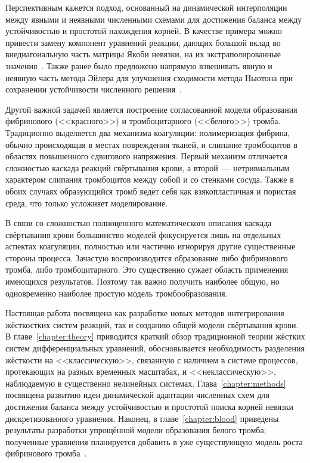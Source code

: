Перспективным кажется подход, основанный на динамической интерполяции между явными и неявными численными схемами
для достижения баланса между устойчивостью и простотой нахождения корней.
В качестве примера можно привести замену компонент уравнений реакции,
дающих большой вклад во внедиагональную часть матрицы Якоби невязки,
на их экстраполированные значения~\cite{vassilevski2020parallel}.
Также ранее было предложено напрямую взвешивать явную и неявную часть метода Эйлера для
улучшения сходимости метода Ньютона при сохранении устойчивости численного решения~\cite{butakov2022two_methods}.

Другой важной задачей является построение согласованной модели образования фибринового (<<красного>>)
и тромбоцитарного (<<белого>>) тромба.
Традиционно выделяется два механизма коагуляции:
полимеризация фибрина, обычно происходящая в местах повреждения тканей,
и слипание тромбоцитов в областях повышенного сдвигового напряжения.
Первый механизм отличается сложностью каскада реакций свёртывания крови,
а второй~--- нетривиальным характером слипания тромбоцитов между собой и со стенками сосуда.
Также в обоих случаях образующийся тромб ведёт себя как взякопластичная и пористая среда,
что только усложняет моделирование.

В связи со сложностью полноценного математического описания каскада свёртывания крови
большинство моделей фокусируется лишь на отдельных аспектах коагуляции,
полностью или частично игнорируя другие существенные стороны процесса.
Зачастую воспроизводится образование либо фибринового тромба,
либо тромбоцитарного.
Это существенно сужает область применения имеющихся результатов.
Поэтому так важно получить наиболее общую,
но одновременно наиболее простую модель тромбообразования.

Настоящая работа посвящена как разработке новых методов интегрирования жёсткостких систем реакций,
так и созданию общей модели свёртывания крови.
В главе~\ref{chapter:theory} приводится краткий обзор традиционной теории жёстких систем дифференциальных уравнений,
обосновывается необходимость разделения жёсткости на <<классическую>>,
связанную с наличием в системе процессов, протекающих на разных временных масштабах,
и <<неклассическую>>, наблюдаемую в существенно нелинейных системах.
Глава~\ref{chapter:methods} посвящена развитию идеи динамической адаптации численных схем
для достижения баланса между устойчивостью и простотой поиска корней невязки дискретизованного уравнения.
Наконец, в главе~\ref{chapter:blood} приведены результаты разработки упрощённой модели образования белого тромба;
полученные уравнения планируется добавить в уже существующую модель роста
фибринового тромба~\cite{bouchnita2020mathematical, vassilevski2020parallel}.

